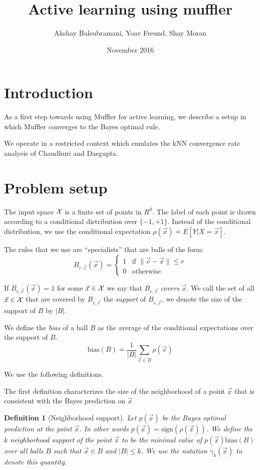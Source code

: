 \documentclass{article}
\title{Active learning using muffler}
\author{Akshay Balsubramani, Yoav Freund, Shay Moran}
\date{November 2016}
\newtheorem{definition}[theorem]{Definition}
\newcommand{\X}{{\cal X}}
\newcommand{\x}{\vec{x}}
\newcommand{\vv}{\vec{v}}
\newcommand{\cc}{\vec{c}}
\newcommand{\bias}{\text{bias}}
\newcommand{\sign}{\text{sign}}
\begin{document}
\maketitle

\section{Introduction}

As a first step towards using Muffler for active learning, we describe
a setup in which Muffler converges to the Bayes optimal rule.

We operate in a restricted context which emulates the kNN 
convergence rate analysis of Chaudhuri and Dasgupta.

\section{Problem setup}

The input space $\X$ is a finite set of points in $R^d$.
The label of each point is drawn according to a conditional
distribution over $\{-1,+1\}$. Instead of the conditional
distribution, we use the conditional expectation
$\rho(\x) \doteq E[Y | X=\x]$.

The rules that we use are ``specialists'' that are balls of the form:
\[
B_{r,\cc}(\x) =
\begin{cases}
 1 & \text{if } \| \cc- \x \| \leq r \\
 0 & \text{otherwise }
\end{cases}
\]

If $B_{r,\cc}(\x) =1$ for some $\x \in \X$ we say that $B_{r,\cc}$
{\em covers} $\x$. We call the set of all $\x \in \X$ that are covered
by $B_{r,\cc}$ the {\em support} of $B_{r,\cc}$, we denote the size of
the support of $B$ by $|B|$.

We define the {\em bias} of a ball $B$ as the average of the
conditional expectations over the support of $B$.
$$
\bias(B) \doteq \frac{1}{|B|} \sum_{\vv \in B} \rho(\vv)
$$

We use the following definitions.

The first definition characterizes the size of the neighborhood of a
point $\x$ that is consistent with the Bayes prediction on $\x$
\begin{definition}[Neighborhood support]
Let $p(\x)$ be the Bayes optimal prediction at the point $\x$. In
other words $p(\x) = \sign(\rho(\x))$. We define the $k$ neighborhood
support  of the  point $\x$ to be the minimal value of $p(\x)\bias(B)$
over all balls $B$ such that $\x \in B$ and $|B|\leq k$. We use the
notation $\gamma_k(\x)$ to denote this quantity.
\end{definition}
\end{document}
